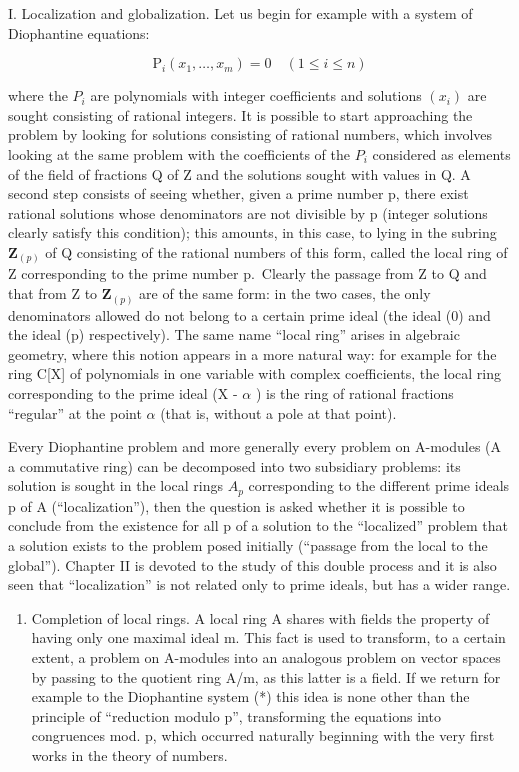 I. Localization and globalization. Let us begin for example with a system of Diophantine equations:

\[
\mathrm{P} _ {i} (x _ {1}, \dots , x _ {m}) = 0 \quad (1 \leqslant i \leqslant n)\tag{*}
\]

where the \(P_{i}\) are polynomials with integer coefficients and solutions \((x_{i})\) are sought consisting of rational integers. It is possible to start approaching the problem by looking for solutions consisting of rational numbers, which involves looking at the same problem with the coefficients of the \(P_{i}\) considered as elements of the field of fractions Q of Z and the solutions sought with values in Q. A second step consists of seeing whether, given a prime number p, there exist rational solutions whose denominators are not divisible by p (integer solutions clearly satisfy this condition); this amounts, in this case, to lying in the subring \(\mathbf{Z}_{(p)}\) of Q consisting of the rational numbers of this form, called the local ring of Z corresponding to the prime number p.~Clearly the passage from Z to Q and that from Z to \(\mathbf{Z}_{(p)}\) are of the same form: in the two cases, the only denominators allowed do not belong to a certain prime ideal (the ideal (0) and the ideal (p) respectively). The same name ``local ring'' arises in algebraic geometry, where this notion appears in a more natural way: for example for the ring C{[}X{]} of polynomials in one variable with complex coefficients, the local ring corresponding to the prime ideal (X - \(\alpha\) ) is the ring of rational fractions ``regular'' at the point \(\alpha\) (that is, without a pole at that point).

Every Diophantine problem and more generally every problem on A-modules (A a commutative ring) can be decomposed into two subsidiary problems: its solution is sought in the local rings \(A_{p}\) corresponding to the different prime ideals p of A (``localization''), then the question is asked whether it is possible to conclude from the existence for all p of a solution to the ``localized'' problem that a solution exists to the problem posed initially (``passage from the local to the global''). Chapter II is devoted to the study of this double process and it is also seen that ``localization'' is not related only to prime ideals, but has a wider range.

\begin{enumerate}
\def\labelenumi{\Roman{enumi}.}
\setcounter{enumi}{1}
\tightlist
\item
  Completion of local rings. A local ring A shares with fields the property of having only one maximal ideal m. This fact is used to transform, to a certain extent, a problem on A-modules into an analogous problem on vector spaces by passing to the quotient ring A/m, as this latter is a field. If we return for example to the Diophantine system (*) this idea is none other than the principle of ``reduction modulo p'', transforming the equations into congruences mod. p, which occurred naturally beginning with the very first works in the theory of numbers.
\end{enumerate}

